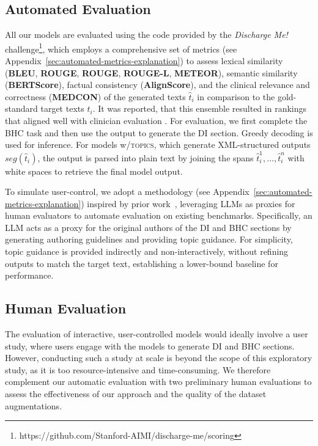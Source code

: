 \subsection{Automated Evaluation}
\label{sec:automated-evaluation}
All our models are evaluated using the code provided by the \textit{Discharge Me!} challenge\footnote{https://github.com/Stanford-AIMI/discharge-me/scoring}, which employs a comprehensive set of metrics (see Appendix~\ref{sec:automated-metrics-explanation}) to assess lexical similarity (\textbf{BLEU}, \textbf{ROUGE}, \textbf{ROUGE}, \textbf{ROUGE\nobreakdash-L}, \textbf{METEOR}), semantic similarity (\textbf{BERTScore}), factual consistency (\textbf{AlignScore}), and the clinical relevance and correctness (\textbf{MEDCON}) of the generated texts $\hat{t}_i$ in comparison to the gold-standard target texts $t_i$. It was reported, that this ensemble resulted in rankings that aligned well with clinician evaluation \cite{xu-etal-2024-overview}.
For evaluation, we first complete the BHC task and then use the output to generate the DI section. Greedy decoding is used for inference. For models w/\textsc{topics}, which generate XML-structured outputs $seg(\hat{t}_i)$, the output is parsed into plain text by joining the spans $\hat{t}_i^1, \dots, \hat{t}_i^n$ with white spaces to retrieve the final model output.


To simulate user-control, we adopt a methodology (see Appendix~\ref{sec:automated-metrics-explanation}) inspired by prior work~\citep{10.1145/3660810,10606356}, leveraging LLMs as proxies for human evaluators to automate evaluation on existing benchmarks. Specifically, an LLM acts as a proxy for the original authors of the DI and BHC sections by generating authoring guidelines and providing topic guidance.
For simplicity, topic guidance is provided indirectly and non-interactively, without refining outputs to match the target text, establishing a lower-bound baseline for performance.

\subsection{Human Evaluation}
The evaluation of interactive, user-controlled models would ideally involve a user study, where users engage with the models to generate DI and BHC sections. However, conducting such a study at scale is beyond the scope of this exploratory study, as it is too resource-intensive and time-consuming. We therefore complement our automatic evaluation with two preliminary human evaluations to assess the effectiveness of our approach and the quality of the dataset augmentations.


